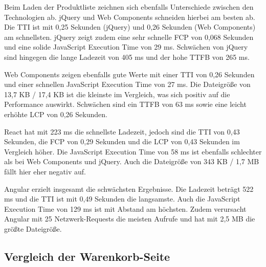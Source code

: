 \documentclass[oneside]{ausarbeitung}
\begin{document}
Beim Laden der Produktliste zeichnen sich ebenfalls Unterschiede zwischen den Technologien ab. jQuery und Web Components schneiden hierbei am besten ab. Die TTI ist mit 0,25 Sekunden (jQuery) und 0,26 Sekunden (Web Components) am schnellsten. jQuery zeigt zudem eine sehr schnelle FCP von 0,068 Sekunden und eine solide JavaScript Execution Time von 29 ms. Schwächen von jQuery sind hingegen die lange Ladezeit von 405 ms und der hohe TTFB von 265 ms.

Web Components zeigen ebenfalls gute Werte mit einer TTI von 0,26 Sekunden und einer schnellen JavaScript Execution Time von 27 ms. Die Dateigröße von 13,7 KB / 17,4 KB ist die kleinste im Vergleich, was sich positiv auf die Performance auswirkt. Schwächen sind ein TTFB von 63 ms sowie eine leicht erhöhte LCP von 0,26 Sekunden.

React hat mit 223 ms die schnellste Ladezeit, jedoch sind die TTI von 0,43 Sekunden, die FCP von 0,29 Sekunden und die LCP von 0,43 Sekunden im Vergleich höher. Die JavaScript Execution Time von 58 ms ist ebenfalls schlechter als bei Web Components und jQuery. Auch die Dateigröße von 343 KB / 1,7 MB fällt hier eher negativ auf.

Angular erzielt insgesamt die schwächsten Ergebnisse. Die Ladezeit beträgt 522 ms und die TTI ist mit 0,49 Sekunden die langsamste. Auch die JavaScript Execution Time von 129 ms ist mit Abstand am höchsten. Zudem verursacht Angular mit 25 Netzwerk-Requests die meisten Aufrufe und hat mit 2,5 MB die größte Dateigröße.

\subsection{Vergleich der Warenkorb-Seite}
\end{document}
